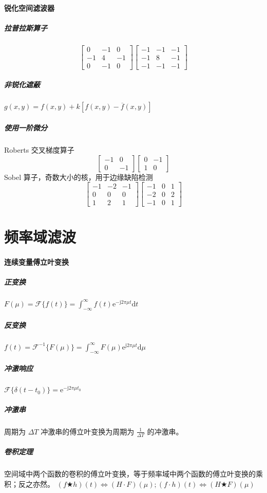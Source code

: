 \documentclass[twocolumn]{ctexart}
\def\ee{\mathrm{e}}
\def\dd{\mathrm{d}}
\def\jj{\mathrm{j}}
\begin{document}
\paragraph{锐化空间滤波器}
\subparagraph{拉普拉斯算子}
\begin{equation*}
    \begin{bmatrix}
        0 & -1 & 0 \\ -1 & 4 & -1 \\ 0 & -1 & 0
    \end{bmatrix}
    \begin{bmatrix}
        -1 & -1 & -1 \\ -1 & 8 & -1 \\ -1 & -1 & -1
    \end{bmatrix}
\end{equation*}
\subparagraph{非锐化遮蔽} $g(x,y)=f(x,y)+k[f(x,y)-\overline{f}(x,y)]$
\subparagraph{使用一阶微分} Roberts 交叉梯度算子
\begin{equation*}
    \begin{bmatrix}
        -1 & 0 \\ 0 & -1
    \end{bmatrix}
    \begin{bmatrix}
        0 & -1 \\ 1 & 0
    \end{bmatrix}
\end{equation*}
Sobel 算子，奇数大小的核，用于边缘缺陷检测
\begin{equation*}
    \begin{bmatrix}
        -1 & -2 & -1 \\ 0 & 0 & 0 \\ 1 & 2 & 1
    \end{bmatrix}
    \begin{bmatrix}
        -1 & 0 & 1 \\ -2 & 0 & 2 \\ -1 & 0 & 1
    \end{bmatrix}
\end{equation*}
\section{频率域滤波}
\paragraph{连续变量傅立叶变换}
\subparagraph{正变换}
$F(\mu)=\mathcal{F}\{f(t)\}=\int_{-\infty}^{\infty}f(t)\ee^{-\jj 2\pi\mu t}\dd t$
\subparagraph{反变换}
$f(t)=\mathcal{F}^{-1}\{F(\mu)\}=\int_{-\infty}^{\infty}F(\mu)
\ee^{\jj 2\pi\mu t}\dd \mu$
\subparagraph{冲激响应} $\mathcal{F}\{\delta(t-t_0)\}=\ee^{-\jj 2\pi\mu t_0}$
\subparagraph{冲激串} 周期为 $\Delta T$ 冲激串的傅立叶变换为周期为 $\frac{1}{\Delta T}$ 的冲激串。
\subparagraph{卷积定理} 空间域中两个函数的卷积的傅立叶变换，等于频率域中两个函数的傅立叶变换的乘积；反之亦然。
$(f\bigstar h)(t)\Leftrightarrow (H\cdot F)(\mu); (f\cdot h)(t)\Leftrightarrow (H\bigstar F)(\mu)$
\end{document}
